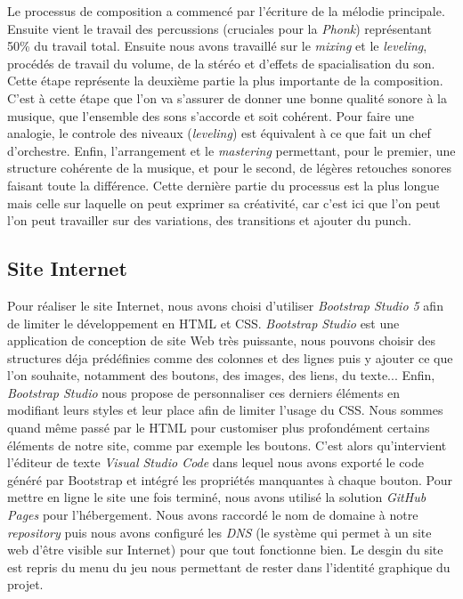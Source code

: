 \documentclass[12pt,a4paper]{article}
\begin{document}
        Le processus de composition a commencé par l'écriture de la mélodie principale. 
        Ensuite vient le travail des percussions (cruciales pour la \textsl{Phonk}) représentant 
        50\% du travail total. Ensuite nous avons travaillé sur le \textit{mixing} et 
        le \textit{leveling}, procédés de travail du volume, de la stéréo et d'effets de 
        spacialisation du son. Cette étape représente la deuxième partie la plus importante 
        de la composition. C'est à cette étape que l'on va s'assurer de donner une bonne qualité
        sonore à la musique, que l'ensemble des sons s'accorde et soit cohérent. Pour faire
        une analogie, le controle des niveaux (\textit{leveling}) est équivalent à ce que fait un chef
        d'orchestre. Enfin, l'arrangement et le \textit{mastering} permettant, pour le premier, une 
        structure cohérente de la musique, et pour le second, de légères retouches
        sonores faisant toute la différence. Cette dernière partie du processus 
        est la plus longue mais celle sur laquelle on peut exprimer sa créativité,
        car c'est ici que l'on peut l'on peut travailler sur des variations, 
        des transitions et ajouter du punch.
    
    \subsection{Site Internet}
        Pour réaliser le site Internet, nous avons choisi d'utiliser \textsl{Bootstrap 
        Studio 5} afin de limiter le développement en HTML et CSS. \textsl{Bootstrap 
        Studio} est une application de conception de site Web très puissante,
        nous pouvons choisir des structures déja prédéfinies comme des colonnes
        et des lignes puis y ajouter ce que l'on souhaite, notamment des boutons, 
        des images, des liens, du texte... Enfin, \textsl{Bootstrap Studio} nous 
        propose de personnaliser ces derniers éléments en modifiant leurs styles 
        et leur place afin de limiter l'usage du CSS. Nous sommes quand même passé 
        par le HTML pour customiser plus profondément certains éléments de notre site,
        comme par exemple les boutons. C'est alors qu'intervient l'éditeur de texte
        \textsl{Visual Studio Code} dans lequel nous avons exporté le code généré 
        par Bootstrap et intégré les propriétés manquantes à chaque bouton. 
        Pour mettre en ligne le site une fois terminé, nous avons utilisé
        la solution \textsl{GitHub Pages} pour l'hébergement. Nous avons raccordé
        le nom de domaine à notre \textit{repository} puis nous avons configuré
        les \textit{DNS} (le système qui permet à un site web d'être visible sur
        Internet) pour que tout fonctionne bien. Le desgin du site est repris du
        menu du jeu nous permettant de rester dans l'identité graphique du projet.
    
\end{document}
